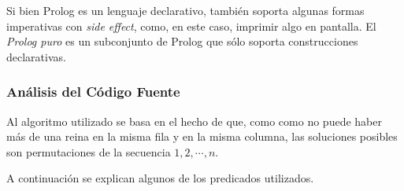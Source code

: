 \documentclass[12pt,titlepage]{article}
\begin{document}
Si bien Prolog es un lenguaje declarativo, también soporta algunas formas imperativas con \emph{side effect}, como, en este caso, imprimir algo en pantalla. El \emph{Prolog puro} es un subconjunto de Prolog que sólo soporta construcciones declarativas.


\subsubsection{Análisis del Código Fuente}
\label{sec:analisisnreinas}

Al algoritmo utilizado se basa en el hecho de que, como como no puede haber más de una reina en la misma fila y en la misma columna, las soluciones posibles son permutaciones de la secuencia $1, 2, \cdots , n$.

A continuación se explican algunos de los predicados utilizados.
\end{document}
